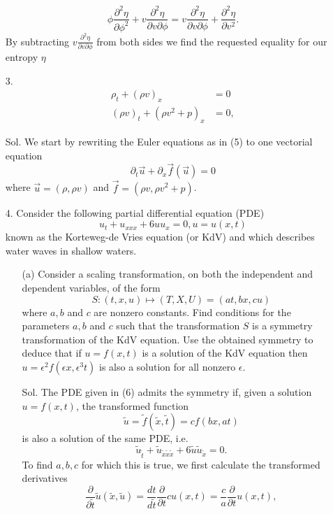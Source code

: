 \documentclass[]{report}
\begin{document}
\begin{itemize}
	\[\phi \frac{\partial^2 \eta}{\partial \phi^2}	+ v  \frac{\partial^2 \eta}{\partial v \partial \phi} =  v  \frac{\partial^2 \eta}{\partial v \partial \phi} + \frac{\partial^2 \eta}{\partial v^2}.\]
	By subtracting $v  \frac{\partial^2 \eta}{\partial v \partial \phi}$ from both sides we find the requested equality for our entropy $\eta$
	\newpage
	\item[3.]
	\begin{equation}
	\begin{split}
		\rho_t +(\rho v)_x &= 0\\
		(\rho v)_t + \left(\rho v^2 + p\right)_x &= 0,
	\end{split}
	\end{equation}
	\item[Sol.]We start by rewriting the Euler equations as in (5) to one vectorial equation
	\[\partial_t\vec{u}+\partial_x \vec{f}(\vec{u})=0\]
	where $\vec{u}=(\rho, \rho v)$ and $\vec{f}=(\rho v,\rho v^2 + p)$. 
	\newpage
	\item[4.]
	Consider the following partial differential equation (PDE)
	\begin{equation}
	u_t + u_{xxx} + 6uu_x = 0, u = u(x, t)
	\end{equation}
	known as the Korteweg-de Vries equation (or KdV) and which describes water waves in shallow waters.
	\begin{itemize}
		\item[(a)] Consider a scaling transformation, on both the independent and dependent
		variables, of the form
		\begin{equation}
		S : (t, x, u) \mapsto (T, X, U) = (at, bx, cu)
		\end{equation}
		where $a, b$ and $c$ are nonzero constants. Find conditions for the parameters $a, b$ and $c$
		such that the transformation $S$ is a symmetry transformation of the KdV equation. Use the obtained symmetry to deduce that if $u = f(x, t)$ is a solution of the KdV equation then $u = \epsilon^2f(\epsilon x, \epsilon^3 t)$ is also a solution for all nonzero $\epsilon$.
		\item[Sol.] The PDE given in (6) admits the symmetry if, given a solution $u = f(x, t)$, the transformed function \[\tilde{u} = \tilde{f}(\tilde{x},\tilde{t})=cf(bx,at)\] 
		is also a solution of the same PDE, i.e.
		\begin{equation}
			\tilde{u}_{\tilde{t}} + \tilde{u}_{\tilde{x}\tilde{x}\tilde{x}} + 6\tilde{u}\tilde{u}_{\tilde{x}} = 0.
		\end{equation}
		To find $a,b,c$ for which this is true, we first calculate the transformed derivatives
		\[\frac{\partial}{\partial\tilde{t}}\tilde{u}(\tilde{x},\tilde{u})=\frac{dt}{d\tilde{t}}\frac{\partial}{\partial t}cu(x,t)=\frac{c}{a}\frac{\partial}{\partial t} u(x,t),\]
		

\end{itemize}
\end{itemize}
\end{document}
